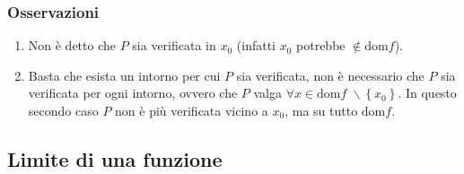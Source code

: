 \documentclass[a4paper]{article}
\newcommand\dom{\text{dom}}
\begin{document}
\subsubsection*{Osservazioni}
\begin{enumerate}
	\item Non è detto che \(P\) sia verificata in \(x_0\) (infatti \(x_0\) potrebbe \(\notin \dom f\)).
	\item Basta che esista un intorno per cui \(P\) sia verificata, non è necessario che \(P\) sia verificata per ogni intorno,
	ovvero che \(P\) valga \(\forall x \in \dom f \; \backslash \left\{ x_0 \right\}\). In questo secondo caso \(P\) non è più
	verificata vicino a \(x_0\), ma su tutto \(\dom f\).
\end{enumerate}


\subsection{Limite di una funzione}
\end{document}
